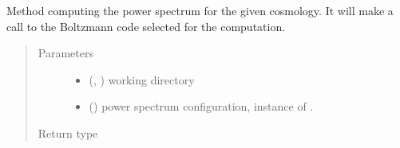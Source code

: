 \documentclass[letterpaper,10pt,english]{sphinxmanual}
\begin{document}
\begin{fulllineitems}
\begin{fulllineitems}
\begin{quote}
\begin{description}
\end{description}\end{quote}

\end{fulllineitems}


\begin{fulllineitems}
\label{\detokenize{api/seyfert.cosmology.cosmology.Cosmology:seyfert.cosmology.cosmology.Cosmology.evaluatePowerSpectrum}}
\sphinxAtStartPar
Method computing the power spectrum for the given cosmology. It will make a call to the Boltzmann code
selected for the computation.
\begin{quote}\begin{description}
\item[{Parameters}] \leavevmode\begin{itemize}
\item {} 
\sphinxAtStartPar
{} (\sphinxcode{\sphinxupquote{Union}}{[}, \sphinxcode{\sphinxupquote{Path}}{]}) \textendash{} working directory

\item {} 
\sphinxAtStartPar
{} () \textendash{} power spectrum configuration, instance of .

\end{itemize}

\item[{Return type}] \leavevmode
\sphinxAtStartPar
{}

\end{description}\end{quote}

\end{fulllineitems}



\end{fulllineitems}
\end{document}
